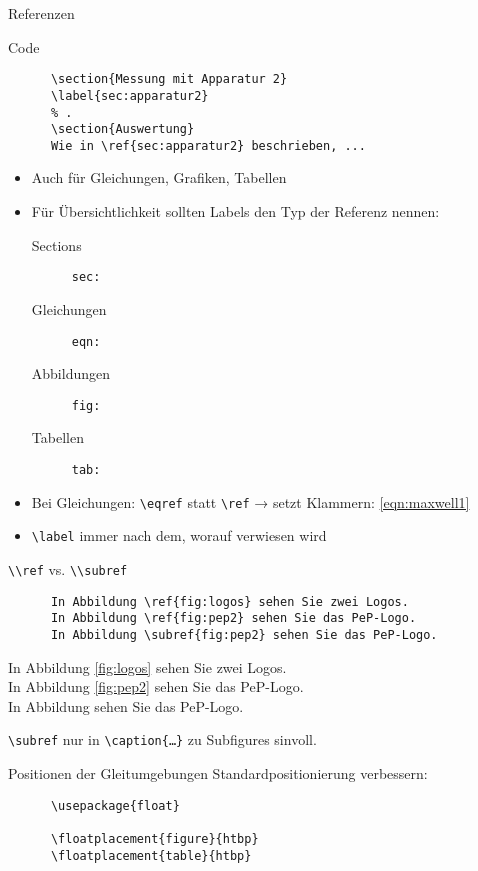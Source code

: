 \begin{frame}[fragile]{Referenzen}
  \begin{block}{Code}
    \begin{lstlisting}
      \section{Messung mit Apparatur 2}
      \label{sec:apparatur2}
      % .
      \section{Auswertung}
      Wie in \ref{sec:apparatur2} beschrieben, ...
    \end{lstlisting}
  \end{block}
  \begin{itemize}
    \item Auch für Gleichungen, Grafiken, Tabellen
    \item Für Übersichtlichkeit sollten Labels den Typ der Referenz nennen:
      \begin{description}
        \item[Sections]    \texttt{sec:}
        \item[Gleichungen] \texttt{eqn:}
        \item[Abbildungen] \texttt{fig:}
        \item[Tabellen]    \texttt{tab:}
      \end{description}
    \item Bei Gleichungen: \lstinline+\eqref+ statt \lstinline+\ref+ → setzt Klammern: \eqref{eqn:maxwell1}
    \item \lstinline+\label+ immer nach dem, worauf verwiesen wird
  \end{itemize}
\end{frame}

\begin{frame}[fragile]{\lstinline+\\ref+ vs. \lstinline+\\subref+}
  \begin{CodeExample}{0.48}
    \begin{lstlisting}
      In Abbildung \ref{fig:logos} sehen Sie zwei Logos.
      In Abbildung \ref{fig:pep2} sehen Sie das PeP-Logo.
      In Abbildung \subref{fig:pep2} sehen Sie das PeP-Logo.
    \end{lstlisting}
    \CodeResult
      In Abbildung \ref{fig:logos} sehen Sie zwei Logos. \\[\baselineskip]
      In Abbildung \ref{fig:pep2} sehen Sie das PeP-Logo. \\
      In Abbildung  sehen Sie das PeP-Logo.
  \end{CodeExample}
  \vspace{2em}
  \lstinline+\subref+ nur in \lstinline+\caption{…}+ zu Subfigures sinvoll.
\end{frame}

\begin{frame}[fragile]{Positionen der Gleitumgebungen}
  Standardpositionierung verbessern:
  \begin{Packages}
    \begin{lstlisting}
      \usepackage{float}

      \floatplacement{figure}{htbp}
      \floatplacement{table}{htbp}
    \end{lstlisting}
  \end{Packages}
\end{frame}
